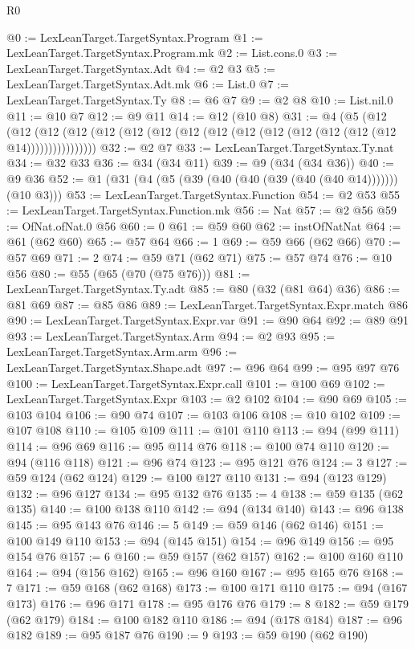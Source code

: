 \begin{lexlean}{R0}
\begin{coremodule}
@0 := LexLeanTarget.TargetSyntax.Program
@1 := LexLeanTarget.TargetSyntax.Program.mk
@2 := List.cons.{0}
@3 := LexLeanTarget.TargetSyntax.Adt
@4 := @2 @3
@5 := LexLeanTarget.TargetSyntax.Adt.mk
@6 := List.{0}
@7 := LexLeanTarget.TargetSyntax.Ty
@8 := @6 @7
@9 := @2 @8
@10 := List.nil.{0}
@11 := @10 @7
@12 := @9 @11
@14 := @12 (@10 @8)
@31 := @4
    (@5
      (@12 (@12 (@12 (@12 (@12 (@12 (@12 (@12 (@12 (@12 (@12 (@12 (@12 (@12 (@12 @14))))))))))))))))
@32 := @2 @7
@33 := LexLeanTarget.TargetSyntax.Ty.nat
@34 := @32 @33
@36 := @34 (@34 @11)
@39 := @9 (@34 (@34 @36))
@40 := @9 @36
@52 := @1 (@31 (@4 (@5 (@39 (@40 (@40 (@39 (@40 (@40 @14))))))) (@10 @3)))
@53 := LexLeanTarget.TargetSyntax.Function
@54 := @2 @53
@55 := LexLeanTarget.TargetSyntax.Function.mk
@56 := Nat
@57 := @2 @56
@59 := OfNat.ofNat.{0} @56
@60 := 0
@61 := @59 @60
@62 := instOfNatNat
@64 := @61 (@62 @60)
@65 := @57 @64
@66 := 1
@69 := @59 @66 (@62 @66)
@70 := @57 @69
@71 := 2
@74 := @59 @71 (@62 @71)
@75 := @57 @74
@76 := @10 @56
@80 := @55 (@65 (@70 (@75 @76)))
@81 := LexLeanTarget.TargetSyntax.Ty.adt
@85 := @80 (@32 (@81 @64) @36)
@86 := @81 @69
@87 := @85 @86
@89 := LexLeanTarget.TargetSyntax.Expr.match @86
@90 := LexLeanTarget.TargetSyntax.Expr.var
@91 := @90 @64
@92 := @89 @91
@93 := LexLeanTarget.TargetSyntax.Arm
@94 := @2 @93
@95 := LexLeanTarget.TargetSyntax.Arm.arm
@96 := LexLeanTarget.TargetSyntax.Shape.adt
@97 := @96 @64
@99 := @95 @97 @76
@100 := LexLeanTarget.TargetSyntax.Expr.call
@101 := @100 @69
@102 := LexLeanTarget.TargetSyntax.Expr
@103 := @2 @102
@104 := @90 @69
@105 := @103 @104
@106 := @90 @74
@107 := @103 @106
@108 := @10 @102
@109 := @107 @108
@110 := @105 @109
@111 := @101 @110
@113 := @94 (@99 @111)
@114 := @96 @69
@116 := @95 @114 @76
@118 := @100 @74 @110
@120 := @94 (@116 @118)
@121 := @96 @74
@123 := @95 @121 @76
@124 := 3
@127 := @59 @124 (@62 @124)
@129 := @100 @127 @110
@131 := @94 (@123 @129)
@132 := @96 @127
@134 := @95 @132 @76
@135 := 4
@138 := @59 @135 (@62 @135)
@140 := @100 @138 @110
@142 := @94 (@134 @140)
@143 := @96 @138
@145 := @95 @143 @76
@146 := 5
@149 := @59 @146 (@62 @146)
@151 := @100 @149 @110
@153 := @94 (@145 @151)
@154 := @96 @149
@156 := @95 @154 @76
@157 := 6
@160 := @59 @157 (@62 @157)
@162 := @100 @160 @110
@164 := @94 (@156 @162)
@165 := @96 @160
@167 := @95 @165 @76
@168 := 7
@171 := @59 @168 (@62 @168)
@173 := @100 @171 @110
@175 := @94 (@167 @173)
@176 := @96 @171
@178 := @95 @176 @76
@179 := 8
@182 := @59 @179 (@62 @179)
@184 := @100 @182 @110
@186 := @94 (@178 @184)
@187 := @96 @182
@189 := @95 @187 @76
@190 := 9
@193 := @59 @190 (@62 @190)

\end{coremodule}
\end{lexlean}
